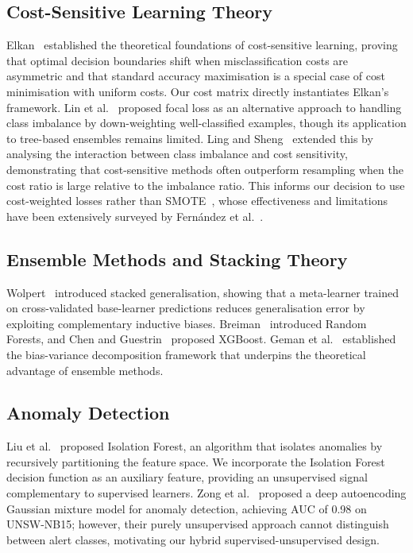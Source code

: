 \documentclass[conference]{IEEEtran}
\begin{document}
\subsection{Cost-Sensitive Learning Theory}
Elkan~\cite{elkan2001} established the theoretical foundations of cost-sensitive learning,
proving that optimal decision boundaries shift when misclassification costs are asymmetric
and that standard accuracy maximisation is a special case of cost minimisation with uniform costs.
Our cost matrix directly instantiates Elkan's framework.
Lin et al.~\cite{lin2017focal} proposed focal loss as an alternative approach to handling
class imbalance by down-weighting well-classified examples, though its application to
tree-based ensembles remains limited.
Ling and Sheng~\cite{ling2008} extended this by analysing the interaction between class imbalance
and cost sensitivity, demonstrating that cost-sensitive methods often outperform resampling
when the cost ratio is large relative to the imbalance ratio.
This informs our decision to use cost-weighted losses rather than SMOTE~\cite{chawla2002smote},
whose effectiveness and limitations have been extensively surveyed by
Fern\'{a}ndez et al.~\cite{fernandez2018smote}.

\subsection{Ensemble Methods and Stacking Theory}
Wolpert~\cite{wolpert1992} introduced stacked generalisation, showing that a meta-learner
trained on cross-validated base-learner predictions reduces generalisation error by exploiting
complementary inductive biases.
Breiman~\cite{breiman2001} introduced Random Forests, and
Chen and Guestrin~\cite{chen2016xgboost} proposed XGBoost.
Geman et al.~\cite{geman1992} established the bias-variance decomposition framework that
underpins the theoretical advantage of ensemble methods.

\subsection{Anomaly Detection}
Liu et al.~\cite{liu2008} proposed Isolation Forest, an algorithm that isolates anomalies
by recursively partitioning the feature space.
We incorporate the Isolation Forest decision function as an auxiliary feature, providing an
unsupervised signal complementary to supervised learners.
Zong et al.~\cite{zong2018} proposed a deep autoencoding Gaussian mixture model for anomaly
detection, achieving AUC of 0.98 on UNSW-NB15; however, their purely unsupervised approach
cannot distinguish between alert classes, motivating our hybrid supervised-unsupervised design.
\end{document}
